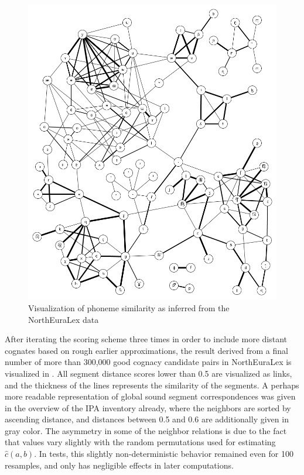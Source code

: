 \begin{figure}
    \includegraphics[width=\textwidth]{figures/phoneme-neighbor-graph.png}
    \caption{Visualization of phoneme similarity as inferred from the NorthEuraLex data}
    \label{fig:phonemDistGlobal}
\end{figure}

After iterating the scoring scheme three times in order to include more distant cognates based on rough earlier approximations, the result derived from a final number of more than 300,000 good cognacy candidate pairs in NorthEuraLex is visualized in . All segment distance scores lower than 0.5 are visualized as links, and the thickness of the lines represents the similarity of the segments. A perhaps more readable representation of global sound segment correspondences was given in the overview of the IPA inventory already, where the neighbors are sorted by ascending distance, and distances between 0.5 and 0.6 are additionally given in gray color. The asymmetry in some of the neighbor relations is due to the fact that values vary slightly with the random permutations used for estimating $\hat{c}(a,b)$. In tests, this slightly non-deterministic behavior remained even for 100 resamples, and only has negligible effects in later computations.

